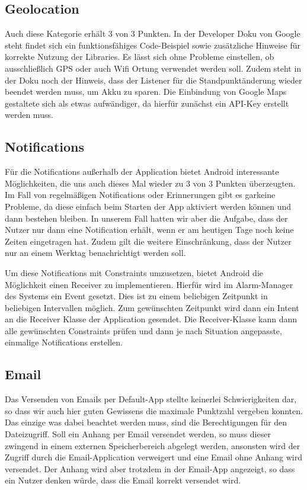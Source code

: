\subsection{Geolocation}
Auch diese Kategorie erhält 3 von 3 Punkten. In der Developer Doku von Google steht findet sich ein funktionsfähiges Code-Beispiel sowie zusätzliche Hinweise für korrekte Nutzung der Libraries. Es lässt sich ohne Probleme einstellen, ob ausschließlich GPS oder auch Wifi Ortung verwendet werden soll. Zudem steht in der Doku noch der Hinweis, dass der Listener für die Standpunktänderung wieder beendet werden muss, um Akku zu sparen. Die Einbindung von Google Maps gestaltete sich als etwas aufwändiger, da hierfür zunächst ein API-Key erstellt werden muss.

\subsection{Notifications}
Für die Notifications außerhalb der Application bietet Android interessante Möglichkeiten, die uns auch dieses Mal wieder zu 3 von 3 Punkten überzeugten. Im Fall von regelmäßigen Notifications oder Erinnerungen gibt es garkeine Probleme, da diese einfach beim Starten der App aktiviert werden können und dann bestehen bleiben. In unserem Fall hatten wir aber die Aufgabe, dass der Nutzer nur dann eine Notification erhält, wenn er am heutigen Tage noch keine Zeiten eingetragen hat. Zudem gilt die weitere Einschränkung, dass der Nutzer nur an einem Werktag benachrichtigt werden soll.

Um diese Notifications mit Constraints umzusetzen, bietet Android die Möglichkeit einen Receiver zu implementieren. Hierfür wird im Alarm-Manager des Systems ein Event ge\-setzt. Dies ist zu einem beliebigen Zeitpunkt in beliebigen Intervallen möglich. Zum gewünschten Zeitpunkt wird dann ein Intent an die Receiver Klasse der Application gesendet. Die Receiver-Klasse kann dann alle gewünschten Constraints prü\-fen und dann je nach Situation angepasste, einmalige Notifications erstellen.

\subsection{Email}
Das Versenden von Emails per Default-App stellte keinerlei Schwierigkeiten dar, so dass wir auch hier guten Gewissens die maximale Punktzahl vergeben konnten. Das einzige was dabei beachtet werden muss, sind die Berechtigungen für den Dateizugriff. Soll ein Anhang per Email versendet werden, so muss dieser zwingend in einem externen Speicherbereich abgelegt werden, ansonsten wird der Zugriff durch die Email-Application verweigert und eine Email ohne Anhang wird versendet. Der Anhang wird aber trotzdem in der Email-App angezeigt, so dass ein Nutzer denken würde, dass die Email korrekt versendet wird.

